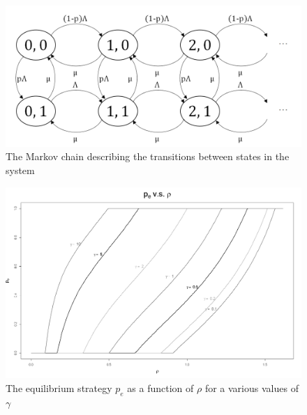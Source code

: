 \documentclass[11pt]{article}
\numberwithin{equation}{section}
\begin{document}
\begin{figure}[h!]
  \centering
    \includegraphics[width=1\textwidth]{plots/MarkovChain.png}
    \caption{The Markov chain describing the transitions between states in the system}
    \label{MarkovChain}
\end{figure}

\newpage
\begin{figure}[h!]
  \centering
    \includegraphics[width=1\textwidth]{plots/peq_vs_rho.png}
    \caption{The equilibrium strategy $p_{e}$ as a function of $\rho$ for a various values of $\gamma$}
    \label{PeqVsRho}
\end{figure}
\end{document}
